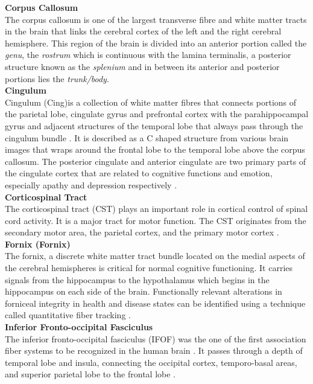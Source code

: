 \documentclass[../structure.tex]{subfiles}
\begin{document}
	\textbf{Corpus Callosum } \\
	The corpus callosum is one of the largest transverse fibre and white matter tracts in the brain that links the cerebral cortex of the left and the right cerebral hemisphere. This region of the brain is divided into an anterior portion called the \textit{genu}, the \textit{rostrum} which is continuous with the lamina terminalis, a posterior structure known as the \textit{splenium} and in between its anterior and posterior portions lies the \textit{trunk/body}.\\


		\textbf{Cingulum}  \\
		Cingulum (Cing)is a collection of white matter fibres that connects portions of the parietal lobe, cingulate gyrus and prefrontal cortex with the parahippocampal gyrus and adjacent structures of the temporal lobe that always pass through the cingulum bundle  \cite{Washington1994}. It is described as a C shaped structure from various brain images that wraps around the frontal lobe to the temporal lobe above the corpus callosum. The posterior cingulate and anterior cingulate are two primary parts of the cingulate cortex that are related to cognitive functions and emotion,  especially apathy and depression respectively \cite{JaredTanner2010}.\\
		
		
	\textbf{Corticospinal Tract } \\	
		The corticospinal tract (CST) plays an important role in cortical control of spinal cord activity. It is a major tract for motor function. The CST originates from the secondary motor area, the parietal cortex, and the primary motor cortex \cite{Seo_2013}.\\
		
		
		\textbf{Fornix (Fornix)} \\		
	The fornix, a discrete white matter tract bundle located on the medial aspects of the cerebral hemispheres is critical for normal cognitive functioning. It carries signals from the hippocampus to the hypothalamus which begins in the hippocampus on each side of the brain. Functionally relevant alterations in forniceal integrity in health and disease states can be identified using a technique called quantitative fiber tracking \cite{Thomas2011}.\\

	
		\textbf{Inferior Fronto-occipital Fasciculus} \\		
		The inferior fronto-occipital fasciculus (IFOF)  was the one of the first association fiber systems to be recognized in the human brain \cite{Wu2016}. It passes through a depth of temporal lobe and insula, connecting the occipital cortex, temporo-basal areas, and superior parietal lobe to the frontal lobe \cite{PDD2015} . \\
\end{document}
